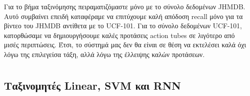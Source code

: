 Για το βήμα ταξινόμησης πειραματιζόμαστε μόνο με το σύνολο δεδομένων \en JHMDB\gr. Αυτό συμβαίνει επειδή καταφέραμε να επιτύχουμε καλή απόδοση \en recall \gr μόνο για τα βίντεο του \en JHMDB \gr
 αντίθετα με το \en UCF-101\gr. Για το σύνολο δεδομένων \en UCF-101\gr, κατορθώσαμε να δημιουργήσουμε καλές προτάσεις \en action tubes \gr σε λιγότερο από μισές περιπτώσεις.
Έτσι, το σύστημά μας δεν θα είναι σε θέση να εκτελέσει καλά όχι λόγω της επιλεγείσα τάξη, αλλά λόγω της έλλειψης καλών προτάσεων.  
\section{}
\subsection{Ταξινομητές \en Linear, SVM  \gr και  \en RNN \gr}


